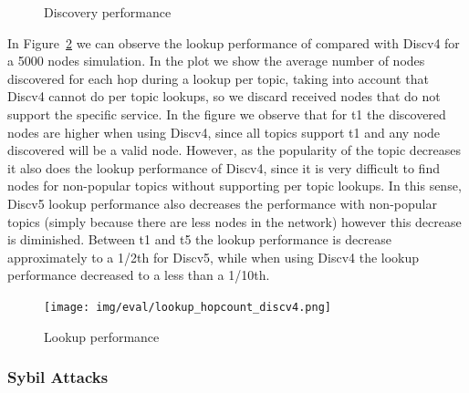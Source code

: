 \begin{figure}[!h]
\centering
{} 
\hspace{-0.25cm}
 \caption{Discovery performance} 
\label{fig:discovery}
\vspace{-0.15in}
\end{figure}   


In Figure~\ref{fig:hopcount} we can observe the lookup performance of \sysname compared with Discv4 for a 5000 nodes simulation.
In the plot we show the average number of nodes discovered for each hop during a lookup per topic, taking into account that Discv4 cannot do per topic lookups,  so we discard received nodes that do not support the specific service.
In the figure we observe that for t1 the discovered nodes are higher when using Discv4, since all topics support t1 and any node discovered will be a valid node. 
However, as the popularity of the topic decreases it also does the lookup performance of Discv4,  since it is very difficult to find nodes for non-popular topics without supporting per topic lookups.
In this sense,  Discv5 lookup performance also decreases the performance with non-popular topics (simply because there are less nodes in the network) however this decrease is diminished.  Between t1 and t5 the lookup performance is decrease approximately to a 1/2th for Discv5, while when using Discv4 the lookup performance decreased to a less than a 1/10th.


\begin{figure}[h!]
\centering
\texttt{[image: img/eval/lookup\_hopcount\_discv4.png]}
\caption{Lookup performance}
\label{fig:hopcount}
\vspace{-0.15in}
\end{figure}

\subsubsection{Sybil Attacks}

